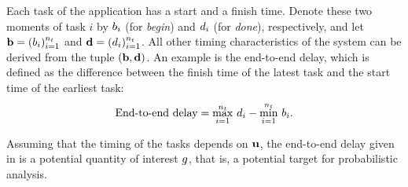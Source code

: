 Each task of the application has a start and a finish time. Denote these two
moments of task $i$ by $b_i$ (for \emph{begin}) and $d_i$ (for \emph{done}),
respectively, and let $\mathbf{b} = (b_i)_{i=1}^{n_t}$ and $\mathbf{d} = (d_i)_{i=1}^{n_t}$. All
other timing characteristics of the system can be derived from the tuple $(\mathbf{b},
\mathbf{d})$. An example is the end-to-end delay, which is defined as the difference
between the finish time of the latest task and the start time of the earliest
task:
\begin{equation} \elab{end-to-end-delay}
  \text{End-to-end delay} = \max_{i = 1}^\nt \, \d_i - \min_{i = 1}^\nt \, \b_i.
\end{equation}

Assuming that the timing of the tasks depends on $\mathbf{u}$, the end-to-end delay
given in  is a potential quantity of interest $g$, that
is, a potential target for probabilistic analysis.
